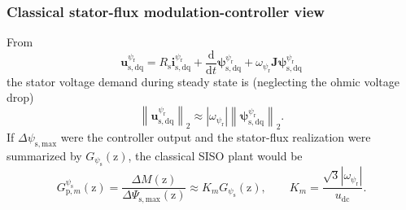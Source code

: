 \begin{frame}
    \frametitle{Classical stator-flux modulation-controller view}
    From
    \begin{equation*}
        \bm{u}_{\mathrm{s,dq}}^{\psi_{\mathrm r}}
        =R_{\mathrm{s}}\bm{i}_{\mathrm{s,dq}}^{\psi_{\mathrm r}}
        +\frac{\mathrm{d}}{\mathrm{d}t}\bm{\psi}_{\mathrm{s,dq}}^{\psi_{\mathrm r}}
        +\omega_{\psi_{\mathrm r}}\bm{J}\bm{\psi}_{\mathrm{s,dq}}^{\psi_{\mathrm r}}
    \end{equation*}\pause%
    the stator voltage demand during steady state is (neglecting the ohmic voltage drop)
    \begin{equation}
        \left\|\bm{u}_{\mathrm{s,dq}}^{\psi_{\mathrm r}}\right\|_2
        \approx |\omega_{\psi_{\mathrm r}}|\left\|\bm{\psi}_{\mathrm{s,dq}}^{\psi_{\mathrm r}}\right\|_2 .
        \label{eq:IM_mod_v06_voltage_flux_approx}
    \end{equation}\pause%
    If $\Delta\psi_{\mathrm{s,max}}$ were the controller output and the stator-flux realization were summarized by $G_{\psi_{\mathrm{s}}}(\mathrm{z})$, the classical SISO plant would be
    \begin{equation}
        G_{\mathrm{p},m}^{\psi_{\mathrm{s}}}(\mathrm{z})
        =\frac{\Delta M(\mathrm{z})}{\Delta\Psi_{\mathrm{s,max}}(\mathrm{z})}
        \approx
        K_mG_{\psi_{\mathrm{s}}}(\mathrm{z}),
        \qquad
        K_m=\frac{\sqrt{3}|\omega_{\psi_{\mathrm r}}|}{u_{\mathrm{dc}}} .
        \label{eq:IM_mod_v06_classical_siso}
    \end{equation}
\end{frame}



